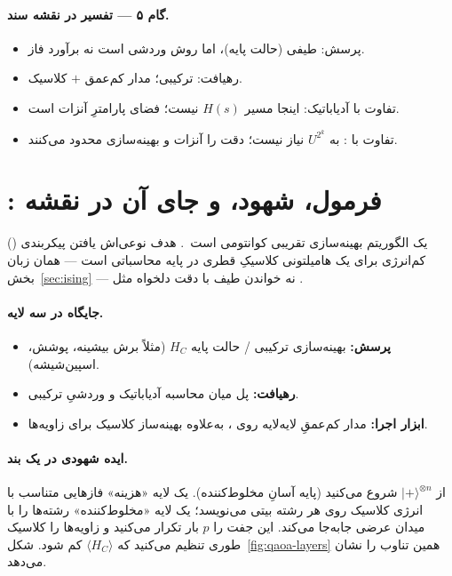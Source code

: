 \paragraph{گام ۵ --- تفسیر در نقشه سند.}
\begin{itemize}
	\item پرسش: طیفی (حالت پایه)، اما روش وردشی است نه برآورد فاز.
	\item رهیافت: ترکیبی؛ مدار کم‌عمق $+$ کلاسیک.
	\item تفاوت با آدیاباتیک: اینجا مسیر $H(s)$ نیست؛ فضای پارامترِ آنزات است.
	\item تفاوت با : به $U^{2^{k}}$ نیاز نیست؛ دقت را آنزات و بهینه‌سازی محدود می‌کنند.
\end{itemize}

\section{: فرمول، شهود، و جای آن در نقشه}
\label{sec:qaoa}

 () یک الگوریتم بهینه‌سازی تقریبی کوانتومی است~\cite{Farhi2014}. هدف نوعی‌اش یافتن پیکربندی کم‌انرژی برای یک هامیلتونی کلاسیکِ قطری در پایه محاسباتی است --- همان زبان  بخش~\ref{sec:ising} --- نه خواندن طیف با دقت دلخواه مثل .

\paragraph{جایگاه در سه لایه.}
\begin{itemize}
	\item \textbf{پرسش:} بهینه‌سازی ترکیبی / حالت پایه $H_C$ (مثلاً برش بیشینه، پوشش، اسپین‌شیشه).
	\item \textbf{رهیافت:} پل میان محاسبه آدیاباتیک و وردشیِ ترکیبی.
	\item \textbf{ابزار اجرا:} مدار کم‌عمقِ لایه‌لایه روی ، به‌علاوه بهینه‌ساز کلاسیک برای زاویه‌ها.
\end{itemize}

\paragraph{ایده شهودی در یک بند.}
از $\lvert+\rangle^{\otimes n}$ شروع می‌کنید (پایه آسانِ مخلوط‌کننده). یک لایه «هزینه» فازهایی متناسب با انرژی کلاسیک روی هر رشته بیتی می‌نویسد؛ یک لایه «مخلوط‌کننده» رشته‌ها را با میدان عرضی جابه‌جا می‌کند. این جفت را $p$ بار تکرار می‌کنید و زاویه‌ها را کلاسیک طوری تنظیم می‌کنید که $\langle H_C\rangle$ کم شود. شکل~\ref{fig:qaoa-layers} همین تناوب را نشان می‌دهد.


